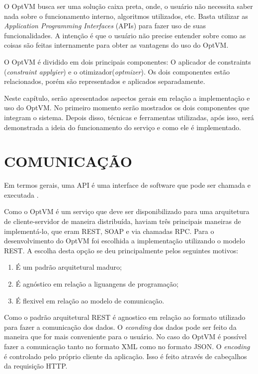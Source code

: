 O OptVM busca ser uma solução caixa preta, onde, o usuário não necessita saber nada sobre o funcionamento interno, 
algoritmos utilizados, etc. Basta utilizar as \textit{Application Programming Interfaces} (APIs) para fazer uso de suas funcionalidades.
A intenção é que o usuário não precise entender sobre como as coisas são feitas internamente para obter as vantagens do uso do OptVM.

O OptVM é dividido em dois principais componentes: O aplicador de constraints (\textit{constraint applyier})
e o otimizador(\textit{optmizer}). Os dois componentes estão relacionados, porém são representados e 
aplicados separadamente. 

Neste capítulo, serão apresentados aspectos gerais em relação a implementação e uso do OptVM. 
No primeiro momento serão mostrados os dois componentes que integram o sistema. 
Depois disso, técnicas e ferramentas utilizadas, após isso, será demonstrada a ideia do funcionamento 
do serviço e como ele é implementado.

\section{COMUNICAÇÃO}
Em termos gerais, uma API é uma interface de software que pode ser chamada e executada \cite{eizinger}. 

Como o OptVM é um serviço que deve ser disponibilizado para uma arquitetura de 
cliente-servidor de maneira distribuída, haviam três principais maneiras de implementá-lo, 
que eram REST, SOAP e via chamadas RPC. 
Para o desenvolvimento do OptVM foi escolhida a implementação utilizando o modelo REST. 
A escolha desta opção se deu principalmente pelos seguintes motivos:

\begin{enumerate}
\item É um padrão arquitetural maduro;
\item É agnóstico em relação a liguangens de programação;
\item É flexivel em relação ao modelo de comunicação.
\end{enumerate}

Como o padrão arquitetural REST é agnostico em relação ao formato utilizado para fazer a comunicação dos dados. O \textit{econding} 
dos dados pode ser feito da maneira que for mais conveniente para o usuário. No caso do OptVM é possível fazer a comunicação
tanto no formato XML como no formato JSON. O \textit{encoding}
é controlado pelo próprio cliente da aplicação. 
Isso é feito através de cabeçalhos da requisição HTTP.

